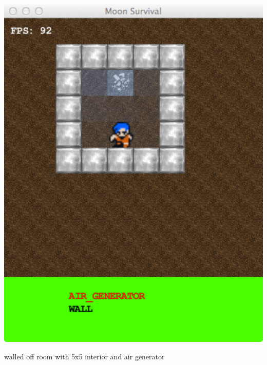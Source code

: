 \begin{marginfigure}
	\includegraphics{res/space_base_prototype/room_with_air_generator.pdf}
	\caption{
	walled off room with 5x5 interior and air generator	}
	\label{fig:SpaceBaseWithAirGenerator}
\end{marginfigure}


